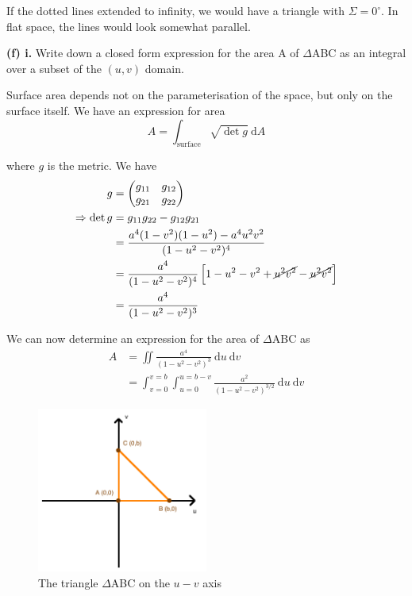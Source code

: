 \documentclass[a4paper]{article} %
\newcommand{\pmx}[1]{\begin{pmatrix}#1\end{pmatrix}}
\begin{document}
If the dotted lines extended to infinity, we would have a triangle with $\Sigma=0^{\circ}$. In flat space, the lines would look somewhat parallel.

\pagebreak  %

\begin{framed}
\textbf{(f) i.} Write down a closed form expression for the area A of $\Delta$ABC as an integral over a subset of the $(u,v)$ domain.
\end{framed}

Surface area depends not on the parameterisation of the space, but only on the surface itself. We have an expression for area
\begin{equation}
A=\int_{\text{surface}}\sqrt{\det g}~\text{d}A
\end{equation}

where $g$ is the metric. We have
\begin{align}
g&=\pmx{g_{11}&g_{12}\\g_{21}&g_{22}}\\
\Rightarrow \det g&=g_{11}g_{22}-g_{12}g_{21}\\
&=\frac{a^4(1-v^2)(1-u^2)-a^4 u^2 v^2}{(1-u^2-v^2)^4}\\
&=\frac{a^4}{(1-u^2-v^2)^4}\left[1-u^2-v^2+\cancel{u^2 v^2}-\cancel{u^2 v^2}\right]\\
&=\frac{a^4}{(1-u^2-v^2)^3}
\end{align}

We can now determine an expression for the area of $\Delta$ABC as
\begin{align}
A&=\iint \frac{a^4}{(1-u^2-v^2)^3}~\text{d}u~\text{d}v\\
&=\int_{v=0}^{v=b}\int_{u=0}^{u=b-v}\frac{a^2}{(1-u^2-v^2)^{3/2}}~\text{d}u~\text{d}v\label{abc area uv}
\end{align}

\begin{figure}[h]
\centering
\includegraphics[width=0.5\textwidth]{images/fi.png}
\caption{The triangle $\Delta$ABC on the $u-v$ axis}
\label{fi figure}
\end{figure}
\end{document}
